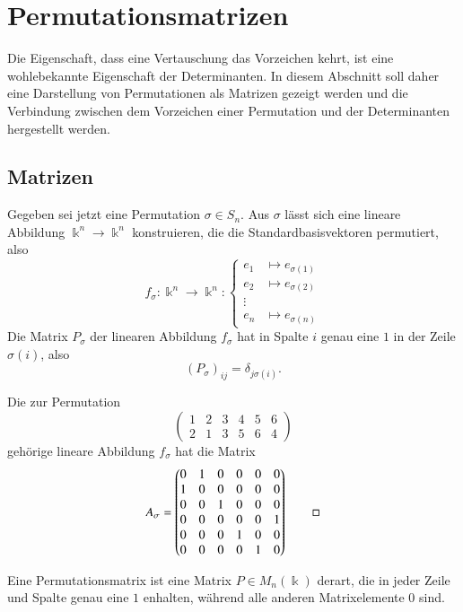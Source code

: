 %
%
%
\section{Permutationsmatrizen
\label{buch:section:permutationsmatrizen}}
Die Eigenschaft, dass eine Vertauschung das Vorzeichen kehrt, ist
eine wohlebekannte Eigenschaft der Determinanten.
In diesem Abschnitt soll daher eine Darstellung von Permutationen
als Matrizen gezeigt werden und die Verbindung zwischen dem
Vorzeichen einer Permutation und der Determinanten hergestellt
werden.

\subsection{Matrizen}
Gegeben sei jetzt eine Permutation $\sigma\in S_n$. 
Aus $\sigma$ lässt sich eine lineare Abbildung $\Bbbk^n\to\Bbbk^n$
konstruieren, die die Standardbasisvektoren permutiert, also
\[
f_{\sigma}\colon
\Bbbk^n \to \Bbbk^n
:
\left\{
\begin{aligned}
e_1&\mapsto e_{\sigma(1)} \\
e_2&\mapsto e_{\sigma(2)} \\
\vdots&\\
e_n&\mapsto e_{\sigma(n)}
\end{aligned}
\right.
\]
Die Matrix $P_\sigma$ der linearen Abbildung $f_{\sigma}$ hat in Spalte $i$
genau eine $1$ in der Zeile $\sigma(i)$, also
\[
(P_\sigma)_{ij} = \delta_{j\sigma(i)}.
\]

\begin{beispiel}
Die zur Permutation
\[
\begin{pmatrix}
1&2&3&4&5&6\\
2&1&3&5&6&4
\end{pmatrix}
\]
gehörige lineare Abbildung $f_\sigma$ hat die Matrix
\[
A_\sigma
=
\begin{pmatrix}
0&1&0&0&0&0\\
1&0&0&0&0&0\\
0&0&1&0&0&0\\
0&0&0&0&0&1\\
0&0&0&1&0&0\\
0&0&0&0&1&0
\end{pmatrix}
\qedhere
\]
\end{beispiel}

\begin{definition}
Eine Permutationsmatrix ist eine Matrix $P\in M_n(\Bbbk)$ 
derart, die in jeder Zeile und Spalte genau eine $1$ enhalten,
während alle anderen Matrixelemente $0$ sind.
\end{definition}

